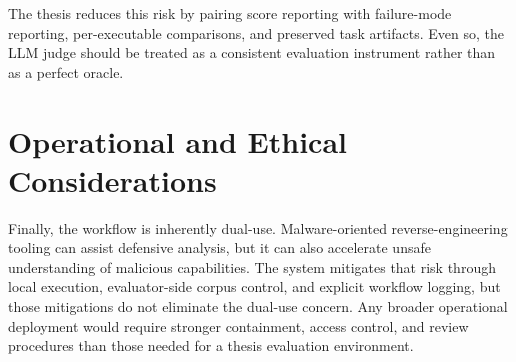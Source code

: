The thesis reduces this risk by pairing score reporting with failure-mode reporting, per-executable comparisons, and preserved task artifacts. Even so, the LLM judge should be treated as a consistent evaluation instrument rather than as a perfect oracle.

\section{Operational and Ethical Considerations}

Finally, the workflow is inherently dual-use. Malware-oriented reverse-engineering tooling can assist defensive analysis, but it can also accelerate unsafe understanding of malicious capabilities. The system mitigates that risk through local execution, evaluator-side corpus control, and explicit workflow logging, but those mitigations do not eliminate the dual-use concern. Any broader operational deployment would require stronger containment, access control, and review procedures than those needed for a thesis evaluation environment.
